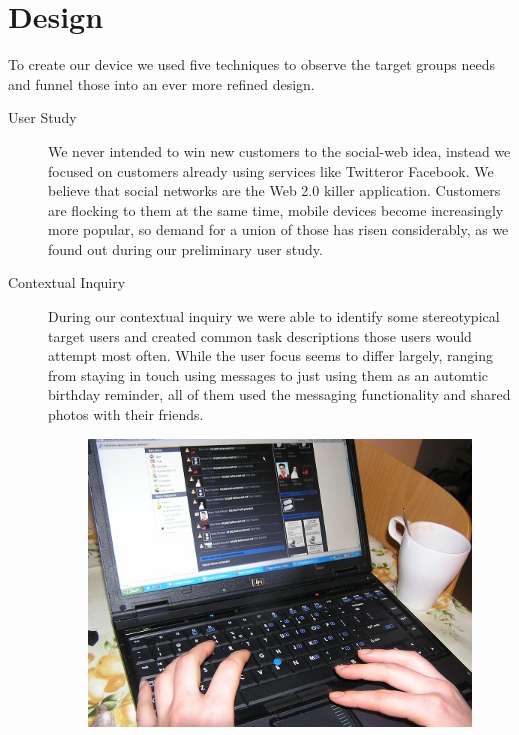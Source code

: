 %
%
%
\section{Design}
%
To create our device we used five techniques 
to observe the target groups needs and funnel those 
into an ever more refined design. 
\begin{description}
  \item[User Study] We never intended to win new customers to 
    the social-web idea, instead we focused on customers already 
    using services like Twitter\trademark or Facebook\registered. 
    We believe that social networks are the Web 2.0 killer application. 
    Customers are flocking to them at the same time, mobile devices
    become increasingly more popular, so demand for a union of 
    those has risen considerably, as we found out during our preliminary 
    user study.
  \item[Contextual Inquiry]
    During our contextual inquiry we were able to identify some stereotypical 
    target users and created common task descriptions those users would 
    attempt most often. While the user focus seems to differ largely, ranging 
    from staying in touch using messages to just using them as an automtic 
    birthday reminder, all of them used the messaging functionality and 
    shared photos with their friends. 
\begin{figure}[h]
  \begin{center}
    \includegraphics[width=0.8\linewidth]{imgs/context.png}

\end{center}
\end{figure}
\end{description}
